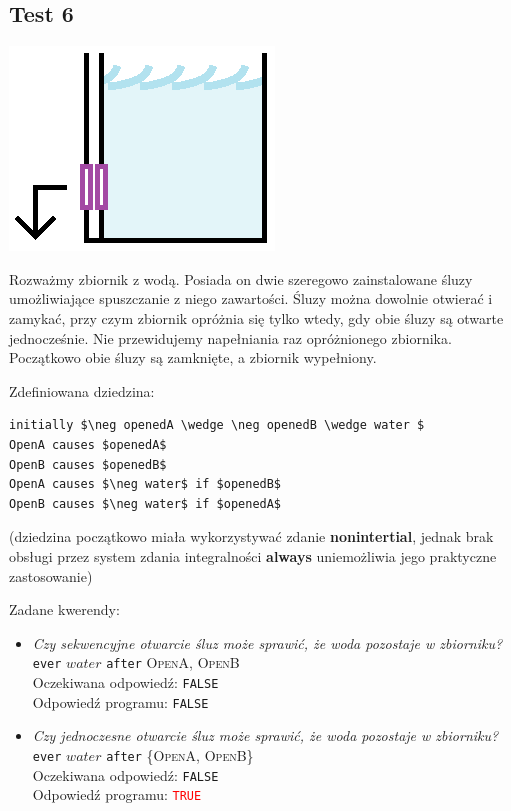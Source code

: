 \documentclass{article}
\begin{document}
\newpage
\subsection{Test 6}

\begin{center}
\includegraphics[scale=1]{test6_1}
\end{center}

Rozważmy zbiornik z wodą. Posiada on dwie szeregowo zainstalowane śluzy umożliwiające spuszczanie z niego zawartości. Śluzy można dowolnie otwierać i zamykać, przy czym zbiornik opróżnia się tylko wtedy, gdy obie śluzy są otwarte jednocześnie. Nie przewidujemy napełniania raz opróżnionego zbiornika. Początkowo obie śluzy są zamknięte, a zbiornik wypełniony.

\bigskip
\noindent
Zdefiniowana dziedzina:
\begin{lstlisting}[mathescape=true]
initially $\neg openedA \wedge \neg openedB \wedge water $
OpenA causes $openedA$
OpenB causes $openedB$
OpenA causes $\neg water$ if $openedB$
OpenB causes $\neg water$ if $openedA$
\end{lstlisting}

\noindent
(dziedzina początkowo miała wykorzystywać zdanie \textbf{nonintertial}, jednak brak obsługi przez system zdania integralności \textbf{always} uniemożliwia jego praktyczne zastosowanie)

\bigskip
\noindent
Zadane kwerendy:

\begin{itemize}
    \item \textit{Czy sekwencyjne otwarcie śluz może sprawić, że woda pozostaje w zbiorniku?}
    \medskip \\
    {\large\texttt{ever} $water$ \texttt{after} \normalsize \textsc{OpenA, OpenB}}\\
    Oczekiwana odpowiedź: \texttt{FALSE}\\
    Odpowiedź programu: \texttt{FALSE}
    
    \item \textit{Czy jednoczesne otwarcie śluz może sprawić, że woda pozostaje w zbiorniku?}
    \medskip \\
    {\large\texttt{ever} $water$ \texttt{after} \normalsize \textsc{\{OpenA, OpenB\}}}\\
    Oczekiwana odpowiedź: \texttt{FALSE}\\
    Odpowiedź programu: \textcolor{red}{\texttt{TRUE}}
\end{itemize}
\end{document}
